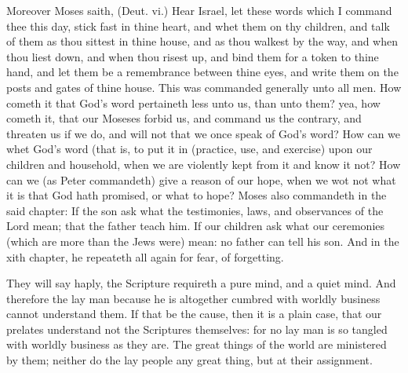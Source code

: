 Moreover Moses saith, (Deut. vi.) Hear Israel,
let these words which I command thee this day,
stick fast in thine heart, and whet them on thy
children, and talk of them as thou sittest in thine
house, and as thou walkest by the way, and when
thou liest down, and when thou risest up, and
bind them for a token to thine hand, and let 
them be a remembrance between thine eyes, 
and write them on the posts and gates of thine 
house. This was commanded generally unto all 
men. How cometh it that God's word pertaineth
less unto us, than unto them? yea, how cometh 
it, that our Moseses forbid us, and command us 
the contrary, and threaten us if we do, and will 
not that we once speak of God's word? How 
can we whet God's word (that is, to put it in
(practice, use, and exercise) upon our children 
and household, when we are violently kept from 
it and know it not? How can we (as Peter commandeth)
give a reason of our hope, when we 
wot not what it is that God hath promised, or 
what to hope? Moses also commandeth in the 
said chapter: If the son ask what the testimonies,
laws, and observances of the Lord mean; that 
the father teach him. If our children ask what 
our ceremonies (which are more than the Jews 
were) mean: no father can tell his son. And in 
the xith chapter, he repeateth all again for fear,
of forgetting.

They will say haply, the Scripture requireth a 
pure mind, and a quiet mind. And therefore 
the lay man because he is altogether cumbred 
with worldly business cannot understand them. 
If that be the cause, then it is a plain case, that 
our prelates understand not the Scriptures themselves:
for no lay man is so tangled with worldly 
business as they are. The great things of the 
world are ministered by them; neither do the 
lay people any great thing, but at their assignment.

